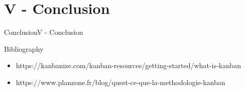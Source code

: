 \documentclass[10pt]{beamer}
\newcommand{\PV}{V - Conclusion}
\begin{document}
\section{\PV} 


\begin{frame}{Conclusion}{\PV}
  

\end{frame}

\begin{frame}{Bibliography}
    \begin{itemize}
        \item https://kanbanize.com/kanban-resources/getting-started/what-is-kanban
        \item https://www.planzone.fr/blog/quest-ce-que-la-methodologie-kanban
    \end{itemize}

\end{frame}
\end{document}
